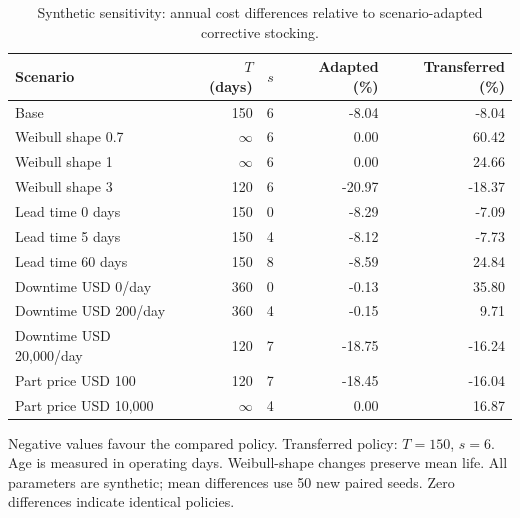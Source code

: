 \begin{table}[htbp]
\centering
\small
\caption{Synthetic sensitivity: annual cost differences relative to scenario-adapted corrective stocking.}
\label{tab:joint-sensitivity}
\begin{tabular}{lrrrr}
\toprule
Scenario & $T$ (days) & $s$ & Adapted (\%) & Transferred (\%) \\
\midrule
Base & 150 & 6 & -8.04 & -8.04 \\
Weibull shape 0.7 & $\infty$ & 6 & 0.00 & 60.42 \\
Weibull shape 1 & $\infty$ & 6 & 0.00 & 24.66 \\
Weibull shape 3 & 120 & 6 & -20.97 & -18.37 \\
Lead time 0 days & 150 & 0 & -8.29 & -7.09 \\
Lead time 5 days & 150 & 4 & -8.12 & -7.73 \\
Lead time 60 days & 150 & 8 & -8.59 & 24.84 \\
Downtime USD 0/day & 360 & 0 & -0.13 & 35.80 \\
Downtime USD 200/day & 360 & 4 & -0.15 & 9.71 \\
Downtime USD 20,000/day & 120 & 7 & -18.75 & -16.24 \\
Part price USD 100 & 120 & 7 & -18.45 & -16.04 \\
Part price USD 10,000 & $\infty$ & 4 & 0.00 & 16.87 \\
\bottomrule
\end{tabular}
\par\smallskip
{\footnotesize Negative values favour the compared policy. Transferred policy: $T=150$, $s=6$. Age is measured in operating days. Weibull-shape changes preserve mean life. All parameters are synthetic; mean differences use 50 new paired seeds. Zero differences indicate identical policies.}
\end{table}
